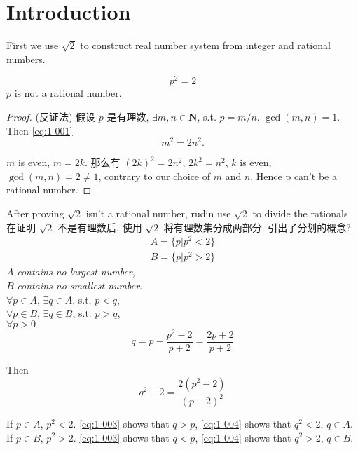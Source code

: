 
\section{Introduction}
First we use $\sqrt{2}$ to construct real number system from integer and rational numbers.

\begin{myExample}\label{Example:1.1}
\begin{equation}\label{eq:1-001}
    p^2=2
\end{equation}
$p$ is not a rational number.
\end{myExample}

\begin{proof}
(反证法) 假设 $p$ 是有理数,  $\exists m,n \in \mathbf{N}$, s.t. $p=m/n$. $\gcd (m,n) = 1$.
Then \ref{eq:1-001}
\begin{equation}\label{eq:1-002}
    m^2 = 2n^2.
\end{equation}

$m$ is even, $m = 2k$.
那么有 $(2k)^2 = 2n^2$, $2k^2 = n^2$, $k$ is even, $\gcd (m,n)=2\neq 1$,
contrary to our choice of $m$ and $n$. Hence p can't be a rational number.
\end{proof}

After proving $\sqrt{2}$ isn't a rational number, rudin use $\sqrt{2}$ to divide the rationals
在证明 $\sqrt{2}$ 不是有理数后, 使用 $\sqrt{2}$ 将有理数集分成两部分.  引出了分划的概念? 
\begin{align*}
    A = \{p|p^2<2\}\\
    B = \{p|p^2>2\}
\end{align*}
$A$ \emph{contains no largest number},\\
$B$ \emph{contains no smallest number}.\\
$\forall p\in A$, $\exists q\in A$, s.t. $p<q$,\\
$\forall p\in B$, $\exists q\in B$, s.t. $p>q$,\\
$\forall p>0$
\begin{equation}\label{eq:1-003}
    q = p-\frac{p^2-2}{p+2} = \frac{2p+2}{p+2}
\end{equation}

Then 
\begin{equation}
    \label{eq:1-004}
    q^2 - 2 = \frac{2(p^2-2)}{(p+2)^2}
\end{equation}

If $p\in A$, $p^2<2$. \ref{eq:1-003} shows that $q>p$, \ref{eq:1-004} shows that $q^2<2$, $q\in A$.
If $p\in B$, $p^2>2$. \ref{eq:1-003} shows that $q<p$, \ref{eq:1-004} shows that $q^2>2$, $q\in B$.


